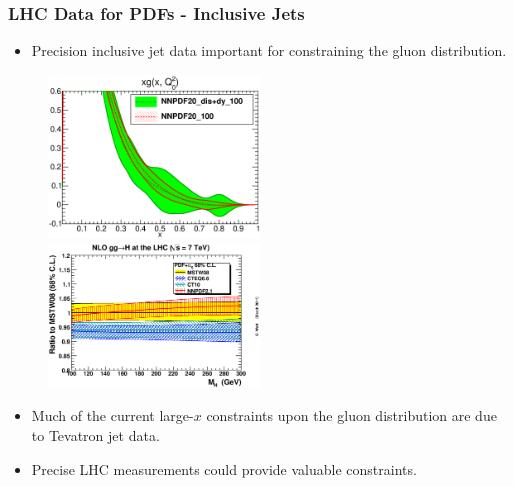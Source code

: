 \documentclass[10pt]{beamer}
\begin{document}
\begin{frame}
\frametitle{LHC Data for PDFs - Inclusive Jets }
\begin{itemize}
\item<1-> Precision inclusive jet data important for constraining the gluon distribution. 
\end{itemize}
 \begin{figure}[b!]
    \begin{center}
      \includegraphics[width=0.50\textwidth]{pdf_xg_band_comparison.eps}
       \includegraphics[width=0.50\textwidth]{ratioggHLHC7TeV68cl_noasth.eps}
    \end{center}
    \vskip-0.5cm
    \label{fig:pdf-jets}
\end{figure}
\begin{itemize}
\item<1-> Much of the current large-$x$ constraints upon the gluon distribution are due to Tevatron jet data. 
\item<1-> Precise LHC measurements could provide valuable constraints.
\end{itemize}
\end{frame}
\end{document}
